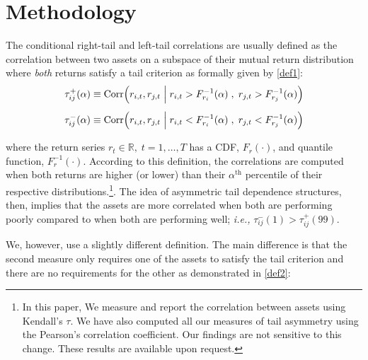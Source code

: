 \documentclass{article}
\begin{document}
\section{Methodology}\label{model}
The conditional right-tail and left-tail correlations are usually defined as the correlation between two assets on a subspace of their mutual return distribution where \textit{both} returns satisfy a tail criterion as formally given by \ref{def1}: 
\vspace{-2mm}
\begin{align}\label{def1}
\begin{split}
\tau_{ij}^{+}(\alpha) &\equiv  \text{Corr}\Big(r_{i,t}, r_{j,t} \hspace{1mm} \Big| \hspace{1mm} r_{i,t} > F^{-1}_{r_{i}}(\alpha) \hspace{1mm} , \hspace{1mm} r_{j,t} > F^{-1}_{r_{j}}(\alpha)\Big)  \\[1.5mm]
\tau_{ij}^{-}(\alpha) &\equiv \text{Corr}\Big(r_{i,t}, r_{j,t} \hspace{1mm} \Big| \hspace{1mm} r_{i,t} < F^{-1}_{r_{i}}(\alpha) \hspace{1mm} , \hspace{1mm} r_{j,t} < F^{-1}_{r_{j}}(\alpha)\Big)  
\end{split}
\end{align}

\noindent where the return series \( r_{t} \in \mathbb{R}, \; t = 1, \dots, T \) has a CDF, \( F_{r}(\cdot) \), and quantile function, \( F^{-1}_{r}(\cdot) \). According to this definition, the correlations are computed when both returns are higher (or lower) than their $\alpha^{\text{th}}$ percentile of their respective distributions.\footnote{In this paper, We measure and report the correlation between assets using Kendall's $\tau$. We have also computed all our measures of tail asymmetry using the Pearson's correlation coefficient. Our findings are not sensitive to this change. These results are available upon request.}. The idea of asymmetric tail dependence structures, then, implies that the assets are more correlated when both are performing poorly compared to when both are performing well; \textit{i.e.,} $\tau_{ij}^{-}(1) > \tau_{ij}^{+}(99)$.\par

We, however, use a slightly different definition. The main difference is that the second measure only requires one of the assets to satisfy the tail criterion and there are no requirements for the other as demonstrated in \ref{def2}:
\end{document}
